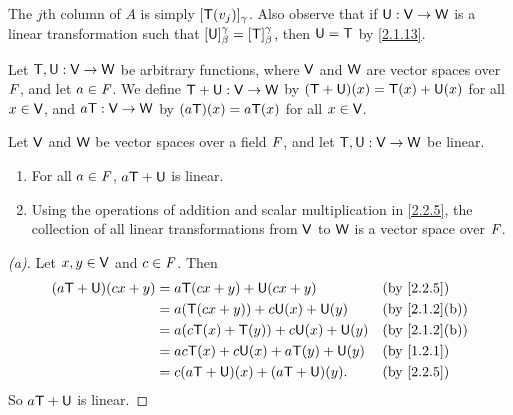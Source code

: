 \begin{note}
	The \(j\)th column of \(A\) is simply \([\mathsf{T}(v_j)]_{\gamma}\).
	Also observe that if \(\mathsf{U} : \mathsf{V} \to \mathsf{W}\) is a linear transformation such that \([\mathsf{U}]_{\beta}^{\gamma} = [\mathsf{T}]_{\beta}^{\gamma}\), then \(\mathsf{U} = \mathsf{T}\) by \cref{2.1.13}.
\end{note}

\begin{defn}\label{2.2.5}
	Let \(\mathsf{T}, \mathsf{U} : \mathsf{V} \to \mathsf{W}\) be arbitrary functions, where \(\mathsf{V}\) and \(\mathsf{W}\) are vector spaces over \(\mathit{F}\), and let \(a \in \mathit{F}\).
	We define \(\mathsf{T} + \mathsf{U} : \mathsf{V} \to \mathsf{W}\) by \((\mathsf{T} + \mathsf{U})(x) = \mathsf{T}(x) + \mathsf{U}(x)\) for all \(x \in \mathsf{V}\), and \(a \mathsf{T}: \mathsf{V} \to \mathsf{W}\) by \((a \mathsf{T})(x) = a \mathsf{T}(x)\) for all \(x \in \mathsf{V}\).
\end{defn}

\begin{thm}\label{2.7}
	Let \(\mathsf{V}\) and \(\mathsf{W}\) be vector spaces over a field \(\mathit{F}\), and let \(\mathsf{T}, \mathsf{U} : \mathsf{V} \to \mathsf{W}\) be linear.
	\begin{enumerate}
		\item For all \(a \in \mathit{F}\), \(a \mathsf{T} + \mathsf{U}\) is linear.
		\item Using the operations of addition and scalar multiplication in \cref{2.2.5}, the collection of all linear transformations from \(\mathsf{V}\) to \(\mathsf{W}\) is a vector space over \(\mathit{F}\).
	\end{enumerate}
\end{thm}

\begin{proof}[(a)]
	Let \(x, y \in \mathsf{V}\) and \(c \in \mathit{F}\).
	Then
	\begin{align*}
		(a \T + \U)(cx + y) & = a \T(cx + y) + \U(cx + y)            &  & \by{2.2.5}    \\
		                    & = a(\T(cx + y)) + c \U(x) + \U(y)      &  & \by{2.1.2}[b] \\
		                    & = a(c \T(x) + \T(y)) + c \U(x) + \U(y) &  & \by{2.1.2}[b] \\
		                    & = ac \T(x) + c \U(x) + a \T(y) + \U(y) &  & \by{1.2.1}    \\
		                    & = c (a \T + \U)(x) + (a \T + \U)(y).   &  & \by{2.2.5}
	\end{align*}
	So \(a \mathsf{T} + \mathsf{U}\) is linear.
\end{proof}

